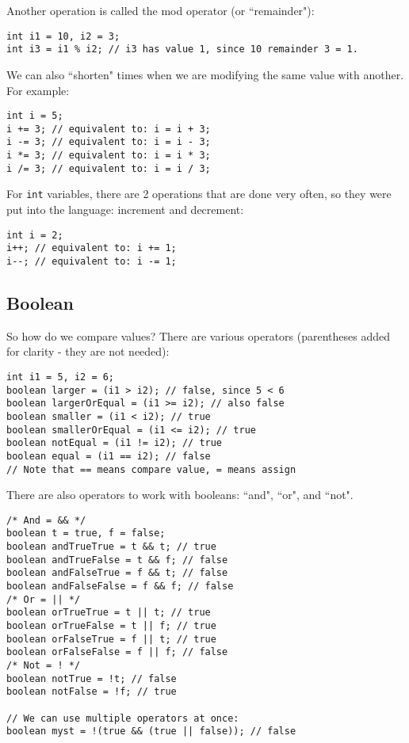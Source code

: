 Another operation is called the mod operator (or ``remainder"):
\begin{lstlisting}
int i1 = 10, i2 = 3;
int i3 = i1 % i2; // i3 has value 1, since 10 remainder 3 = 1.
\end{lstlisting}

We can also ``shorten" times when we are modifying the same value with another. For example:
\begin{lstlisting}
int i = 5;
i += 3; // equivalent to: i = i + 3;
i -= 3; // equivalent to: i = i - 3;
i *= 3; // equivalent to: i = i * 3;
i /= 3; // equivalent to: i = i / 3;
\end{lstlisting}

For \verb|int| variables, there are 2 operations that are done very often, so they were put into the language: increment and decrement:
\begin{lstlisting}
int i = 2;
i++; // equivalent to: i += 1;
i--; // equivalent to: i -= 1;
\end{lstlisting}

\subsection{Boolean}

So how do we compare values? There are various operators (parentheses added for clarity - they are not needed):
\begin{lstlisting}
int i1 = 5, i2 = 6;
boolean larger = (i1 > i2); // false, since 5 < 6
boolean largerOrEqual = (i1 >= i2); // also false
boolean smaller = (i1 < i2); // true
boolean smallerOrEqual = (i1 <= i2); // true
boolean notEqual = (i1 != i2); // true
boolean equal = (i1 == i2); // false
// Note that == means compare value, = means assign
\end{lstlisting}

There are also operators to work with booleans: ``and", ``or", and ``not".
\begin{lstlisting}
/* And = && */
boolean t = true, f = false;
boolean andTrueTrue = t && t; // true
boolean andTrueFalse = t && f; // false
boolean andFalseTrue = f && t; // false
boolean andFalseFalse = f && f; // false
/* Or = || */
boolean orTrueTrue = t || t; // true
boolean orTrueFalse = t || f; // true
boolean orFalseTrue = f || t; // true
boolean orFalseFalse = f || f; // false
/* Not = ! */
boolean notTrue = !t; // false
boolean notFalse = !f; // true

// We can use multiple operators at once:
boolean myst = !(true && (true || false)); // false
\end{lstlisting}

